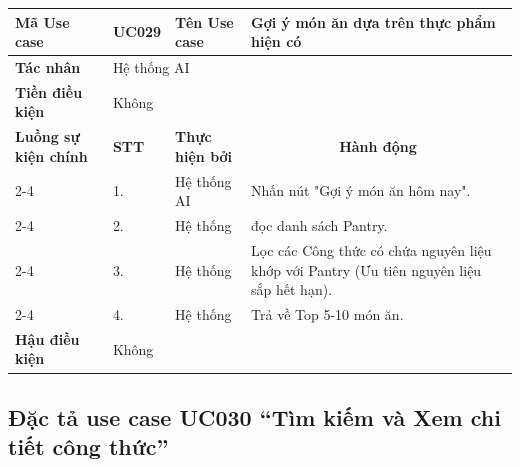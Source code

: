 \documentclass[../main.tex]{subfiles}
\begin{document}
\begin{longtable}{|p{2.7cm}|p{0.8cm}|p{2.6cm}|p{7.3cm}|}
\hline
\cellcolor[HTML]{D5F5E3}\textbf{Mã Use case} & \multicolumn{1}{l|}{UC029} & \cellcolor[HTML]{D5F5E3}\textbf{Tên Use case} & Gợi ý món ăn dựa trên thực phẩm hiện có \\ \hline
\cellcolor[HTML]{D5F5E3}\textbf{Tác nhân} & \multicolumn{3}{p{10.7cm}|}{Hệ thống AI} \\ \hline
\cellcolor[HTML]{D5F5E3}\textbf{Tiền điều kiện} & \multicolumn{3}{p{10.7cm}|}{Không} \\ \hline

\cellcolor[HTML]{D5F5E3}\textbf{Luồng sự kiện chính} & \cellcolor[HTML]{FDEBD0}\textbf{STT} & \cellcolor[HTML]{FDEBD0}\textbf{Thực hiện bởi} & \multicolumn{1}{c|}{\cellcolor[HTML]{FDEBD0}\textbf{Hành động}} \\ \cline{2-4} 
\cellcolor[HTML]{D5F5E3} & 1. & Hệ thống AI & Nhấn nút "Gợi ý món ăn hôm nay". \\ \cline{2-4} 
\cellcolor[HTML]{D5F5E3} & 2. & Hệ thống & đọc danh sách Pantry. \\ \cline{2-4} 
\cellcolor[HTML]{D5F5E3} & 3. & Hệ thống & Lọc các Công thức có chứa nguyên liệu khớp với Pantry (Ưu tiên nguyên liệu sắp hết hạn). \\ \cline{2-4} 
\cellcolor[HTML]{D5F5E3} & 4. & Hệ thống & Trả về Top 5-10 món ăn. \\ \hline

\cellcolor[HTML]{D5F5E3}\textbf{Hậu điều kiện} & \multicolumn{3}{p{10.7cm}|}{Không} \\ \hline
\end{longtable}
\endgroup

\subsection{Đặc tả use case UC030 ``Tìm kiếm và Xem chi tiết công thức''}
\vspace{0.5cm}

\begingroup
\renewcommand{\arraystretch}{1.5}
\end{document}
